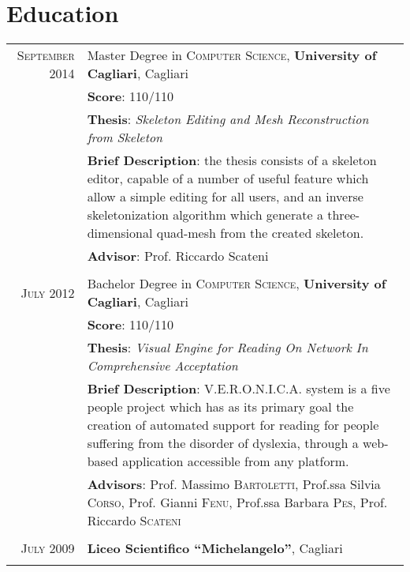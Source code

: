 \documentclass[a4paper,10pt]{article} %
\begin{document}

\section{Education}

\begin{tabular}{rp{11cm}}	
\textsc{September} 2014 & Master Degree in \textsc{Computer Science}, \textbf{University of Cagliari}, Cagliari\\
& \textbf{Score}: 110/110\\
& \textbf{Thesis}: \textit{Skeleton Editing and Mesh Reconstruction from Skeleton}
\\
& \textbf{Brief Description}: the thesis consists of a skeleton editor, capable of a number of useful feature which allow a simple editing for all users, and an inverse skeletonization algorithm which generate a three-dimensional quad-mesh from the created skeleton. \\
& \small \textbf{Advisor}: Prof. Riccardo Scateni\\
&\\



\textsc{July} 2012 & Bachelor Degree in \textsc{Computer Science}, \textbf{University of Cagliari}, Cagliari\\
& \textbf{Score}: 110/110\\
& \textbf{Thesis}: \textit{Visual Engine for Reading On Network In Comprehensive Acceptation} \\
& \textbf{Brief Description}: V.E.R.O.N.I.C.A. system is a five people project which has as its primary goal the creation of automated support for reading for people suffering from the disorder of dyslexia, through a web-based application accessible from any platform.\\
&\small \textbf{Advisors}: Prof. Massimo \textsc{Bartoletti}, Prof.ssa Silvia \textsc{Corso}, Prof. Gianni \textsc{Fenu}, Prof.ssa Barbara \textsc{Pes}, Prof. Riccardo \textsc{Scateni}\\
&\\


\textsc{July} 2009 & \textbf{Liceo Scientifico ``Michelangelo''}, Cagliari\\
&\\

\end{tabular}
\end{document}
